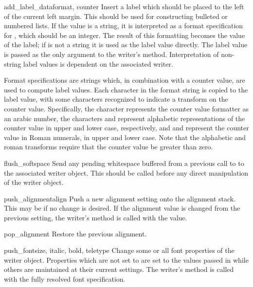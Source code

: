 \begin{methoddesc}[formatter]{add_label_data}{format, counter}
Insert a label which should be placed to the left of the current left
margin.  This should be used for constructing bulleted or numbered
lists.  If the  value is a string, it is interpreted as a
format specification for , which should be an integer.
The result of this formatting becomes the value of the label; if
 is not a string it is used as the label value directly.
The label value is passed as the only argument to the writer's
 method.  Interpretation of non-string label
values is dependent on the associated writer.

Format specifications are strings which, in combination with a counter
value, are used to compute label values.  Each character in the format
string is copied to the label value, with some characters recognized
to indicate a transform on the counter value.  Specifically, the
character  represents the counter value formatter as an
arabic number, the characters  and 
represent alphabetic representations of the counter value in upper and
lower case, respectively, and  and 
represent the counter value in Roman numerals, in upper and lower
case.  Note that the alphabetic and roman transforms require that the
counter value be greater than zero.
\end{methoddesc}

\begin{methoddesc}[formatter]{flush_softspace}{}
Send any pending whitespace buffered from a previous call to
 to the associated writer object.  This
should be called before any direct manipulation of the writer object.
\end{methoddesc}

\begin{methoddesc}[formatter]{push_alignment}{align}
Push a new alignment setting onto the alignment stack.  This may be
 if no change is desired.  If the alignment value is
changed from the previous setting, the writer's 
method is called with the  value.
\end{methoddesc}

\begin{methoddesc}[formatter]{pop_alignment}{}
Restore the previous alignment.
\end{methoddesc}

\begin{methoddesc}[formatter]{push_font}{\code{(}size, italic, bold, teletype\code{)}}
Change some or all font properties of the writer object.  Properties
which are not set to  are set to the values passed in
while others are maintained at their current settings.  The writer's
 method is called with the fully resolved font
specification.
\end{methoddesc}


